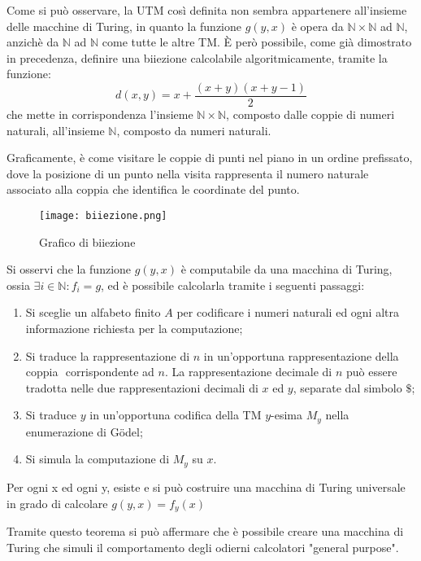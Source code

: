   Come si può osservare, la UTM così definita non sembra appartenere all'insieme delle macchine di Turing, in quanto la funzione \(g(y,x)\) è opera da \(\mathbb{N}\times\mathbb{N}\) ad \(\mathbb{N}\), anzichè da \(\mathbb{N}\) ad \(\mathbb{N}\) come tutte le altre TM. È però possibile, come già dimostrato in precedenza, definire una biiezione calcolabile algoritmicamente, tramite la funzione:
  \begin{equation*}
    \displaystyle d(x,y) = x+\frac{(x+y)(x+y-1)}{2}
  \end{equation*}
  che mette in corrispondenza l'insieme \(\mathbb{N}\times\mathbb{N}\), composto dalle coppie di numeri naturali, all'insieme \(\mathbb{N}\), composto da numeri naturali.

  Graficamente, è come visitare le coppie di punti nel piano in un ordine prefissato, dove la posizione di un punto nella visita rappresenta il numero naturale associato alla coppia che identifica le coordinate del punto.
  
  \begin{figure}[!h]
    \centering
    \texttt{[image: biiezione.png]} 
    \caption{Grafico di biiezione}
  \end{figure}

  Si osservi che la funzione \(g(y,x)\) è computabile da una macchina di Turing, ossia \(\exists i\in \mathbb N : f_i=g\), ed è possibile calcolarla tramite i seguenti passaggi:
  \begin{enumerate}
    \item Si sceglie un alfabeto finito \(A\) per codificare i numeri naturali ed ogni altra informazione richiesta per la computazione;
    \item Si traduce la rappresentazione di \(n\) in un'opportuna rappresentazione della coppia \(<x,y>\) corrispondente ad \(n\). La rappresentazione decimale di \(n\) può essere tradotta nelle due rappresentazioni decimali di \(x\) ed \(y\), separate dal simbolo \(\$\);
    \item Si traduce \(y\) in un'opportuna codifica della TM \(y\)-esima \(M_y\) nella enumerazione di Gödel;
    \item Si simula la computazione di \(M_y\) su \(x\).
  \end{enumerate}

  \begin{theorem}
    Per ogni x ed ogni y, esiste e si può costruire una macchina di Turing universale in grado di calcolare \(g(y,x)=f_y(x)\)
  \end{theorem}  
  Tramite questo teorema si può affermare che è possibile creare una macchina di Turing che simuli il comportamento degli odierni calcolatori "general purpose".

